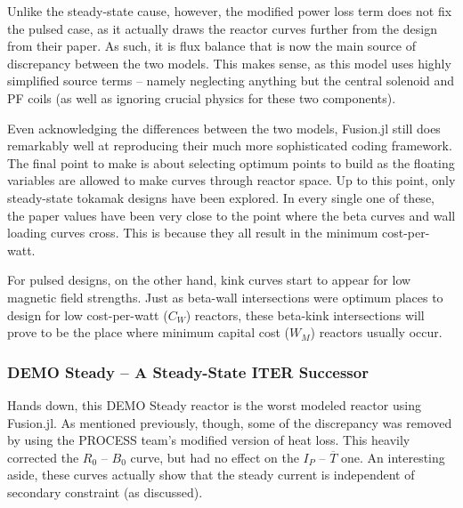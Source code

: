 Unlike the steady-state cause, however, the modified power loss term does not fix the pulsed case, as it actually draws the reactor curves further from the design from their paper. As such, it is flux balance that is now the main source of discrepancy between the two models. This makes sense, as this model uses highly simplified source terms -- namely neglecting anything but the central solenoid and PF coils (as well as ignoring crucial physics for these two components).

Even acknowledging the differences between the two models, Fusion.jl still does remarkably well at reproducing their much more sophisticated coding framework. The final point to make is about selecting optimum points to build as the floating variables are allowed to make curves through reactor space. Up to this point, only steady-state tokamak designs have been explored. In every single one of these, the paper values have been very close to the point where the beta curves and wall loading curves cross. This is because they all result in the minimum cost-per-watt. 

For pulsed designs, on the other hand, kink curves start to appear for low magnetic field strengths. Just as beta-wall intersections were optimum places to design for low cost-per-watt ($C_W$) reactors, these beta-kink intersections will prove to be the place where minimum capital cost ($W_M$) reactors usually occur.

\newpage 

\subsubsection{DEMO Steady -- A Steady-State ITER Successor}

Hands down, this DEMO Steady reactor is the worst modeled reactor using Fusion.jl. As mentioned previously, though, some of the discrepancy was removed by using the PROCESS team's modified version of heat loss. This heavily corrected the $R_0$ -- $B_0$ curve, but had no effect on the $I_P$ -- $\overline T$ one. An interesting aside, these curves actually show that the steady current is independent of secondary constraint (as discussed).

